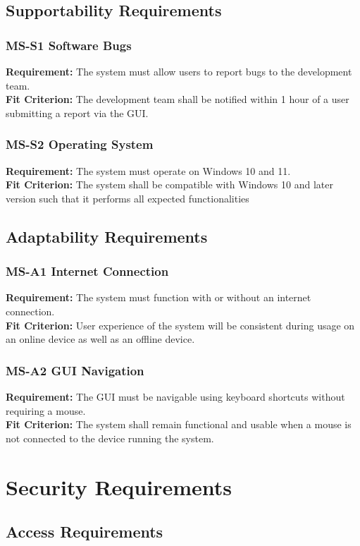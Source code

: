 \documentclass[12pt]{article}
\begin{document}
\subsection{Supportability Requirements}
\subsubsection*{MS-S1 Software Bugs}
\textbf{Requirement:} The system must allow users to report bugs to the development team. \\ 
\textbf{Fit Criterion:} The development team shall be notified within 1 hour of a user submitting a report via the GUI.
\subsubsection*{MS-S2 Operating System}
\textbf{Requirement:} The system must operate on Windows 10 and 11. \\ 
\textbf{Fit Criterion:} The system shall be compatible with Windows 10 and later version such that it performs all expected functionalities

\subsection{Adaptability Requirements}
\subsubsection*{MS-A1 Internet Connection}
\textbf{Requirement:} The system must function with or without an internet connection. \\ 
\textbf{Fit Criterion:} User experience of the system will be consistent during usage on an online device as well as an offline device.
\subsubsection*{MS-A2 GUI Navigation}
\textbf{Requirement:} The GUI must be navigable using keyboard shortcuts without requiring a mouse. \\ 
\textbf{Fit Criterion:} The system shall remain functional and usable when a mouse is not connected to the device running the system.


\section{Security Requirements}
\subsection{Access Requirements}
\end{document}
